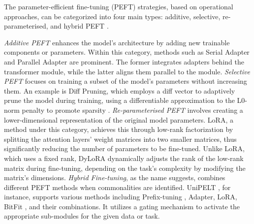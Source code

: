 The parameter-efficient fine-tuning (PEFT) strategies, based on operational approaches, can be categorized into four main types: additive, selective, re-parameterised, and hybrid PEFT \cite{hanParameterEfficientFineTuningLarge2024}. 

\textit{Additive PEFT} enhances the model's architecture by adding new trainable components or parameters. Within this category, methods such as Serial Adapter and Parallel Adapter \cite{heUnifiedViewParameterEfficient2022} are prominent. The former integrates adapters behind the transformer module, while the latter aligns them parallel to the module. \textit{Selective PEFT} focuses on training a subset of the model's parameters without increasing them. An example is Diff Pruning, which employs a diff vector to adaptively prune the model during training, using a differentiable approximation to the L0-norm penalty to promote sparsity \cite{guoParameterEfficientTransferLearning2021}. \textit{Re-parameterised PEFT} involves creating a lower-dimensional representation of the original model parameters. LoRA, a method under this category, achieves this through low-rank factorization by splitting the attention layers' weight matrices into two smaller matrices, thus significantly reducing the number of parameters to be fine-tuned. Unlike LoRA, which uses a fixed rank, DyLoRA \cite{valipourDyLoRAParameterEfficient2023} dynamically adjusts the rank of the low-rank matrix during fine-tuning, depending on the task's complexity by modifying the matrix's dimensions. \textit{Hybrid Fine-tuning}, as the name suggests, combines different PEFT methods when commonalities are identified. UniPELT \cite{maoUniPELTUnifiedFramework2022}, for instance, supports various methods including Prefix-tuning \cite{liPrefixTuningOptimizingContinuous2021}, Adapter, LoRA, BitFit \cite{zakenBitFitSimpleParameterefficient2022}, and their combinations. It utilizes a gating mechanism to activate the appropriate sub-modules for the given data or task.





